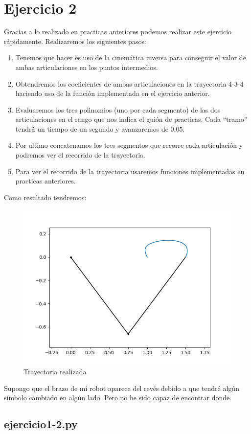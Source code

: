 \documentclass[12pt,a4paper]{report}
\begin{document}
 \section*{Ejercicio 2}
 Gracias a lo realizado en practicas anteriores podemos realizar este ejercicio rápidamente. Realizaremos los siguientes pasos:
 \begin{enumerate}
 	\item Tenemos que hacer es uso de la cinemática inversa para conseguir el valor de ambas articulaciones en los puntos intermedios.
 	\item Obtendremos los coeficientes de ambas articulaciones en la trayectoria 4-3-4 haciendo uso de la función implementada en el ejercicio anterior.
 	\item Evaluaremos los tres polinomios (uno por cada segmento) de las dos articulaciones en el rango que nos indica el guión de practicas. Cada ``tramo'' tendrá un tiempo de un segundo y avanzaremos de $0.05$.
 	\item Por ultimo concatenamos los tres segmentos que recorre cada articulación y podremos ver el recorrido de la trayectoria.
 	\item Para ver el recorrido de la trayectoria usaremos funciones implementadas en practicas anteriores.
\end{enumerate}	
Como resultado tendremos:
\begin{figure}[H]
	\centering
	\includegraphics[width=0.7\linewidth]{img/anima.png}
	\caption{Trayectoria realizada}
	\label{fig:ej4}
\end{figure}
Supongo que el brazo de mi robot aparece del revés debido a que tendré algún símbolo cambiado en algún lado. Pero no he sido capaz de encontrar donde.
\begin{appendices}
	\section*{ejercicio1-2.py}
	


\end{appendices}
\end{document}
